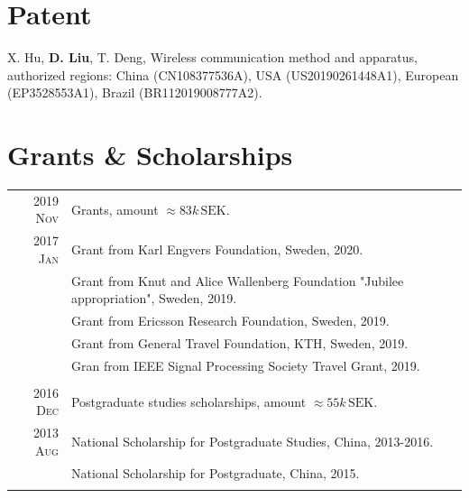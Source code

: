 \documentclass[a4paper,10pt]{article}
\begin{document}
\section{Patent}
 X. Hu, \textbf{D. Liu}, T. Deng, Wireless communication method and apparatus, authorized regions: China (CN108377536A), USA (US20190261448A1), European (EP3528553A1), Brazil (BR112019008777A2).

\section{Grants \& Scholarships}
\begin{savenotes}
  \begin{longtable}{r|p{13cm}}
    \textsc{2019 Nov} & Grants, amount $\approx 83k\,\mathrm{SEK}$.\\
    \textsc{2017 Jan} & Grant from Karl Engvers Foundation, Sweden, 2020. \\

                      &  Grant from Knut and Alice Wallenberg Foundation
                        "Jubilee appropriation", Sweden, 2019. \\
                      & Grant from Ericsson Research Foundation, Sweden, 2019. \\
                      & Grant from General Travel Foundation, KTH, Sweden, 2019. \\
                      & Gran from IEEE Signal Processing Society Travel Grant, 2019. \\
    \multicolumn{2}{c}{} \\
    \textsc{2016 Dec} & Postgraduate studies scholarships, amount $\approx 55k\,\mathrm {SEK}$. \\
    \textsc{2013 Aug} & National Scholarship for Postgraduate Studies, China, 2013-2016. \\
                      & National Scholarship for Postgraduate, China, 2015.\\
    \multicolumn{2}{c}{} \\


\end{longtable}
\end{savenotes}
\end{document}

